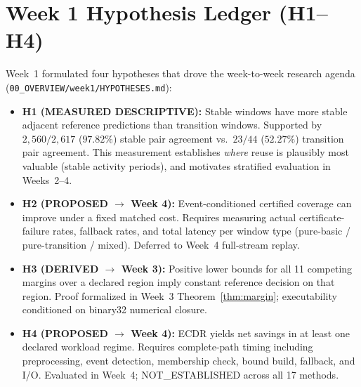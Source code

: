 \documentclass[11pt,oneside,a4paper]{report}
\newcommand{\code}[1]{{\small\upshape\ttfamily #1}}
\newcommand{\pathcode}[1]{{\small\upshape\ttfamily\nolinkurl{#1}}}
\theoremstyle{remark}
\begin{document}
\section{Week 1 Hypothesis Ledger (\code{H1}--\code{H4})}
Week~1 formulated four hypotheses that drove the week-to-week research agenda (\pathcode{00_OVERVIEW/week1/HYPOTHESES.md}):
\begin{itemize}[leftmargin=1.5em]
  \item \textbf{H1 (MEASURED DESCRIPTIVE):} Stable windows have more stable adjacent reference predictions than transition windows. Supported by $2{,}560/2{,}617$ ($97.82\%$) stable pair agreement vs.\ $23/44$ ($52.27\%$) transition pair agreement. This measurement establishes \emph{where} reuse is plausibly most valuable (stable activity periods), and motivates stratified evaluation in Weeks~2--4.
  \item \textbf{H2 (PROPOSED $\to$ Week 4):} Event-conditioned certified coverage can improve under a fixed matched cost. Requires measuring actual certificate-failure rates, fallback rates, and total latency per window type (pure-basic / pure-transition / mixed). Deferred to Week~4 full-stream replay.
  \item \textbf{H3 (DERIVED $\to$ Week 3):} Positive lower bounds for all 11 competing margins over a declared region imply constant reference decision on that region. Proof formalized in Week~3 Theorem~\ref{thm:margin}; executability conditioned on binary32 numerical closure.
  \item \textbf{H4 (PROPOSED $\to$ Week 4):} ECDR yields net savings in at least one declared workload regime. Requires complete-path timing including preprocessing, event detection, membership check, bound build, fallback, and I/O. Evaluated in Week~4; \code{NOT\_ESTABLISHED} across all 17 methods.
\end{itemize}
\end{document}
